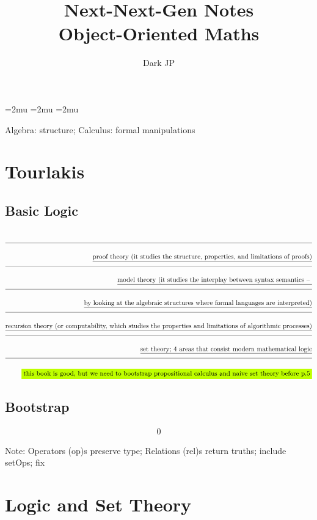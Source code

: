 \documentclass[a4paper]{article}
\title{Next-Next-Gen Notes \\
\large Object-Oriented Maths}
\author{Dark JP}
\newcommand{\TODO}[1]{\colorbox{lime}{\text{#1}}}
\newcommand{\notes}[1]{\underline{\text{#1}}}
\newcommand{\n}{\\[1.5ex] \hline \nonumber \\[0ex]}
\begin{document}
\maketitle
\allowdisplaybreaks


\thinmuskip=2mu %
\medmuskip=2mu %
\thickmuskip=2mu %
\setlength{\belowdisplayskip}{0pt} \setlength{\belowdisplayshortskip}{0pt}
\setlength{\abovedisplayskip}{0pt} \setlength{\abovedisplayshortskip}{0pt}


Algebra: structure; Calculus: formal manipulations
\section{Tourlakis}
\subsection{Basic Logic}
\begin{tcolorbox}
\begin{align}
    \n \notes{proof theory (it studies the structure, properties, and limitations of proofs)}
    \n \notes{model theory (it studies the interplay between syntax semantics – }
    \n \notes{by looking at the algebraic structures where formal languages are interpreted)}
    \n \notes{recursion theory (or computability, which studies the properties and limitations of algorithmic processes)}
    \n \notes{set theory; 4 areas that consist modern mathematical logic}
    \n \TODO{this book is good, but we need to bootstrap propositional calculus and naive set theory before p.5}
\end{align}
\end{tcolorbox}

\subsection{Bootstrap}
\begin{tcolorbox}
\begin{align}
    0
\end{align}
\end{tcolorbox}


Note: Operators (op)s preserve type; Relations (rel)s return truths; include setOps; fix
\section{Logic and Set Theory}
\end{document}
